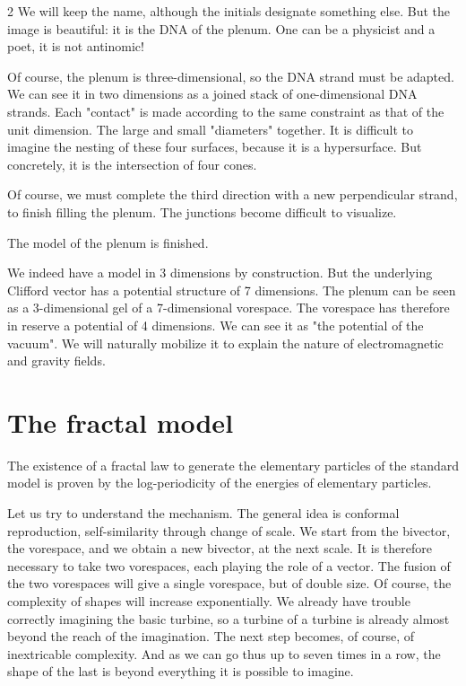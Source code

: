 \begin{multicols}{2}
	We will keep the name, although the initials designate something else. But 
	the image is beautiful: it is the DNA of the plenum. One can be a physicist and 
	a poet, it is not antinomic!
	
	Of course, the plenum is three-dimensional, so the DNA strand 
	must be adapted. We can see it in two dimensions as a 
	joined stack of one-dimensional DNA strands. Each "contact" 
	is made according to the same constraint as that of the unit 
	dimension. The large and small "diameters" together. It is 
	difficult to imagine the nesting of these four surfaces, because 
	it is a hypersurface. But concretely, it is the intersection of 
	four cones.
	
	Of course, we must complete the third direction with a new 
	perpendicular strand, to finish filling the plenum. The junctions 
	become difficult to visualize.
	
	The model of the plenum is finished.
	\medskip
	
	We indeed have a model in 3 dimensions by construction. But the 
	underlying Clifford vector has a potential structure of 7 dimensions. 
	The plenum can be seen as a 3-dimensional gel of a 
	7-dimensional vorespace. The vorespace has therefore in reserve a 
	potential of 4 dimensions. We can see it as "the potential of 
	the vacuum". We will naturally mobilize it to explain the nature of 
	electromagnetic and gravity fields.
	
	\section{The fractal model}
	
	The existence of a fractal law to generate the elementary particles 
	of the standard model is proven by the log-periodicity of the 
	energies of elementary particles.
	
	Let us try to understand the mechanism. The general idea is 
	conformal reproduction, self-similarity through change of scale. 
	We start from the bivector, the vorespace, and we obtain a new 
	bivector, at the next scale. It is therefore necessary to take two 
	vorespaces, each playing the role of a vector. The fusion of the two 
	vorespaces will give a single vorespace, but of double size. Of 
	course, the complexity of shapes will increase exponentially. 
	We already have trouble correctly imagining the basic turbine, so a 
	turbine of a turbine is already almost beyond the reach of the imagination. 
	The next step becomes, of course, of inextricable complexity. And 
	as we can go thus up to seven times in a row, the shape of the last 
	is beyond everything it is possible to imagine.
	

\end{multicols}
